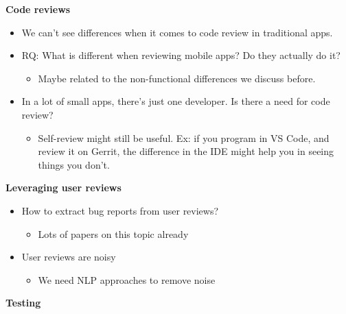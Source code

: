 \documentclass[a4paper]{article}
\begin{document}
\textbf{Code reviews}

\begin{itemize}
\item We can't see differences when it comes to code review in traditional apps.
\item RQ: What is different when reviewing mobile apps? Do they actually do it?
	\begin{itemize}
	\item Maybe related to the non-functional differences we discuss before.
	\end{itemize}
\item In a lot of small apps, there's just one developer. Is there a need for code review?
	\begin{itemize}
	\item Self-review might still be useful. Ex: if you program in VS Code, and review it on Gerrit, the difference in the IDE might help you in seeing things you don't.
	\end{itemize}
\end{itemize}

\textbf{Leveraging user reviews}

\begin{itemize}
\item How to extract bug reports from user reviews?
	\begin{itemize}
	\item Lots of papers on this topic already
	\end{itemize}
\item User reviews are noisy
	\begin{itemize}
	\item We need NLP approaches to remove noise
	\end{itemize}
\end{itemize}

\textbf{Testing}
\end{document}
